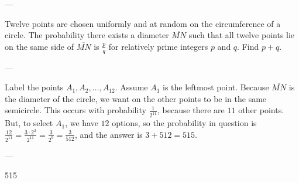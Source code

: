 
---

Twelve points are chosen uniformly and at random on the circumference of a circle. The probability there exists a diameter $\overline{MN}$ such that all twelve points lie on the same side of $\overline{MN}$ is $\frac{p}{q}$ for relatively prime integers $p$ and $q$. Find $p+q$. 

---

Label the points $A_1,A_2,\ldots,A_{12}$. Assume $A_1$ is the leftmost point. Because $\overline{MN}$ is the diameter of the circle, we want on the other points to be in the same semicircle. This occurs with probability $\frac{1}{2^{11}}$, because there are $11$ other points. But, to select $A_1$, we have $12$ options, so the probability in question is $\frac{12}{2^{11}}=\frac{3\cdot 2^2}{2^{11}}=\frac{3}{2^9}=\frac{3}{512}$, and the answer is $3+512=515$.

---

515
